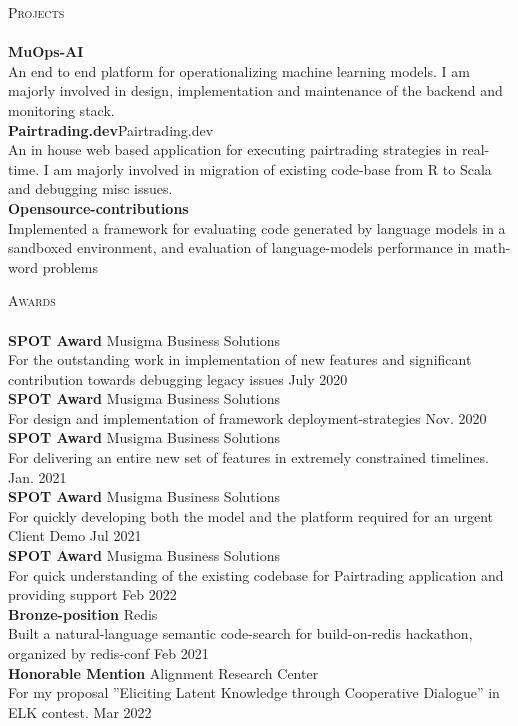 \documentclass[a4paper]{article}
\newcommand{\lineunder} {
    \vspace*{-8pt} \\
    \hspace*{-18pt} \hrulefill \\
}
\newcommand{\header} [1] {
    {\hspace*{-18pt}\vspace*{6pt} \textsc{#1}}
    \vspace*{-6pt} \lineunder
}
\begin{document}
\header{Projects}
{\textbf{MuOps-AI}}\\
An end to end platform for operationalizing machine learning models. I am majorly involved in design, implementation and maintenance of the backend and monitoring stack.\\
\vspace*{2mm}
{\textbf{Pairtrading.dev}}\hfill Pairtrading.dev\\
An in house web based application for executing pairtrading strategies in real-time. I am majorly involved in migration of existing code-base from R to Scala and debugging misc issues.\\
\vspace*{2mm}
{\textbf{Opensource-contributions}}\\
Implemented a framework for evaluating code generated by language models in a sandboxed environment, and evaluation of language-model\textquotesingle{}s performance in math-word problems\\
\vspace*{2mm}

\header{Awards}
\textbf{SPOT Award} \hfill Musigma Business Solutions\\
For the outstanding work in implementation of new features and significant contribution towards debugging legacy issues \hfill July 2020\\
\vspace*{2mm}
\textbf{SPOT Award} \hfill Musigma Business Solutions\\
For design and implementation of framework deployment-strategies \hfill Nov. 2020\\
\vspace*{2mm}
\textbf{SPOT Award} \hfill Musigma Business Solutions\\
For delivering an entire new set of features in extremely constrained timelines. \hfill Jan. 2021\\
\vspace*{2mm}
\textbf{SPOT Award} \hfill Musigma Business Solutions\\
For quickly developing both the model and the platform required for an urgent Client Demo \hfill Jul 2021\\
\vspace*{2mm}
\textbf{SPOT Award} \hfill Musigma Business Solutions\\
For quick understanding of the existing codebase for Pairtrading application and providing support \hfill Feb 2022\\
\vspace*{2mm}
\textbf{Bronze-position} \hfill Redis\\
Built a natural-language semantic code-search for build-on-redis hackathon, organized by redis-conf \hfill Feb 2021\\
\vspace*{2mm}
\textbf{Honorable Mention} \hfill Alignment Research Center\\
For my proposal ”Eliciting Latent Knowledge through Cooperative Dialogue” in ELK contest. \hfill Mar 2022\\
\vspace*{2mm}

\ 
\end{document}
